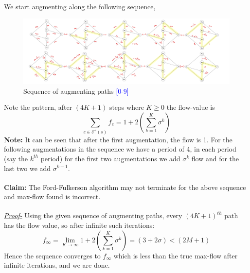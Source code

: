 \documentclass{article}
\begin{document}
    We start augmenting along the following sequence, 
    \begin{figure}[H]
        \centering
        \includegraphics[width = \linewidth]{resources/HW1Q3.jpg}
        \caption{Sequence of augmenting paths \textcolor{blue}{[0-9]}}
        \label{fig:enter-label}
    \end{figure}
    \noindent Note the pattern, after $(4K+1)$ steps where $K\ge 0$ the flow-value is 
    \begin{equation*}
        \sum_{e\in \delta^+(s)} f_e = 1 + 2 \left(\sum_{k=1}^{K}\sigma^k\right)
    \end{equation*}
    \textbf{Note:} It can be seen that after the first augmentation, the flow is 1. For the following augmentations in the sequence we have a period of 4, in each period (say the $k^{th}$ period) for the first two augmentations we add $\sigma^k$ flow and for the last two we add $\sigma^{k+1}$. \\\\
    \textbf{Claim:} The Ford-Fulkerson algorithm may not terminate for the above sequence and max-flow found is incorrect.\\\\
    \textit{\underline{Proof-}} Using the given sequence of augmenting paths, every $(4K+1)^{th}$ path has the flow value, so after infinite such iterations: 
    \begin{equation*}
        f_\infty = \lim_{K\rightarrow \infty} 1 + 2 \left(\sum_{k=1}^{K}\sigma^k\right) = (3 + 2\sigma) < (2M+1)
    \end{equation*}
    Hence the sequence converges to $f_\infty$ which is less than the true max-flow after infinite iterations, and we are done. 
\end{document}
